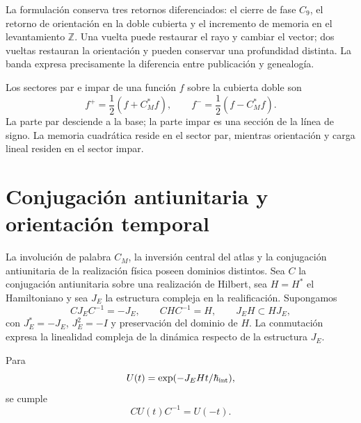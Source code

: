La formulaci\'on conserva tres retornos diferenciados: el cierre de fase
\(C_9\), el retorno de orientaci\'on en la doble cubierta y el incremento de
memoria en el levantamiento \(\mathbb Z\). Una vuelta puede restaurar el
rayo y cambiar el vector; dos vueltas restauran la orientaci\'on y pueden
conservar una profundidad distinta. La banda expresa precisamente la
diferencia entre publicaci\'on y genealog\'ia.

Los sectores par e impar de una funci\'on \(f\) sobre la cubierta doble son
\begin{equation}
 f^+=\frac12(f+C_M^*f),
 \qquad
 f^-=\frac12(f-C_M^*f).
 \label{eq:rm-obs-even-odd-decomposition}
\end{equation}
La parte par desciende a la base; la parte impar es una secci\'on de la
l\'inea de signo. La memoria cuadr\'atica reside en el sector par, mientras
orientaci\'on y carga lineal residen en el sector impar.

\section{Conjugaci\'on antiunitaria y orientaci\'on temporal}

La involuci\'on de palabra \(C_M\), la inversi\'on central del atlas y la
conjugaci\'on antiunitaria de la realizaci\'on f\'isica poseen dominios
distintos. Sea \(C\) la conjugaci\'on antiunitaria sobre una realizaci\'on de
Hilbert, sea \(H=H^*\) el Hamiltoniano y sea \(J_E\) la estructura compleja
en la realificaci\'on. Supongamos
\begin{equation}
 CJ_EC^{-1}=-J_E,
 \qquad
 CHC^{-1}=H,
 \qquad
 J_EH\subset HJ_E,
 \label{eq:rm-obs-antiunitary-hypotheses}
\end{equation}
con \(J_E^*=-J_E\), \(J_E^2=-I\) y preservaci\'on del dominio de \(H\).
La conmutaci\'on expresa la linealidad compleja de la din\'amica respecto de
la estructura \(J_E\).

\begin{proposition}
\label{prop:rm-obs-antiunitary-time}
Para
\begin{equation}
 U(t)=\exp(-J_EHt/\hbar_{\rm int}),
 \label{eq:rm-obs-unitary-evolution}
\end{equation}
se cumple
\begin{equation}
 \boxed{CU(t)C^{-1}=U(-t).}
 \label{eq:rm-obs-time-reversal}
\end{equation}
\end{proposition}

